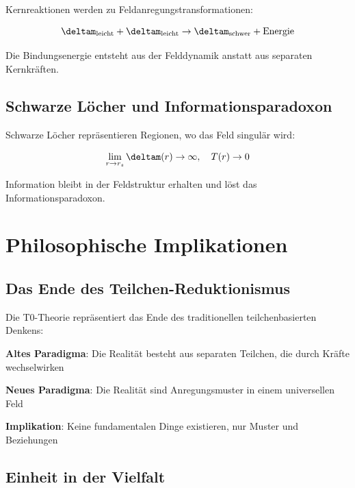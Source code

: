 	Kernreaktionen werden zu Feldanregungstransformationen:
	
	\begin{equation}
		\deltam_{\text{leicht}} + \deltam_{\text{leicht}} \rightarrow \deltam_{\text{schwer}} + \text{Energie}
		\label{eq:nucleosynthesis_field}
	\end{equation}
	
	Die Bindungsenergie entsteht aus der Felddynamik anstatt aus separaten Kernkräften.
	
	\subsection{Schwarze Löcher und Informationsparadoxon}
	
	Schwarze Löcher repräsentieren Regionen, wo das Feld singulär wird:
	
	\begin{equation}
		\lim_{r \to r_s} \deltam(r) \to \infty, \quad T(r) \to 0
		\label{eq:black_hole_singularity}
	\end{equation}
	
	Information bleibt in der Feldstruktur erhalten und löst das Informationsparadoxon.
	
	\section{Philosophische Implikationen}
	
	\subsection{Das Ende des Teilchen-Reduktionismus}
	
	Die T0-Theorie repräsentiert das Ende des traditionellen teilchenbasierten Denkens:
	
	\begin{tcolorbox}[colback=purple!5!white,colframe=purple!75!black,title=Paradigmenwechsel: Von Teilchen zu Mustern]
		\textbf{Altes Paradigma}: Die Realität besteht aus separaten Teilchen, die durch Kräfte wechselwirken
		
		\textbf{Neues Paradigma}: Die Realität sind Anregungsmuster in einem universellen Feld
		
		\textbf{Implikation}: Keine fundamentalen Dinge existieren, nur Muster und Beziehungen
	\end{tcolorbox}
	
	\subsection{Einheit in der Vielfalt}
	

